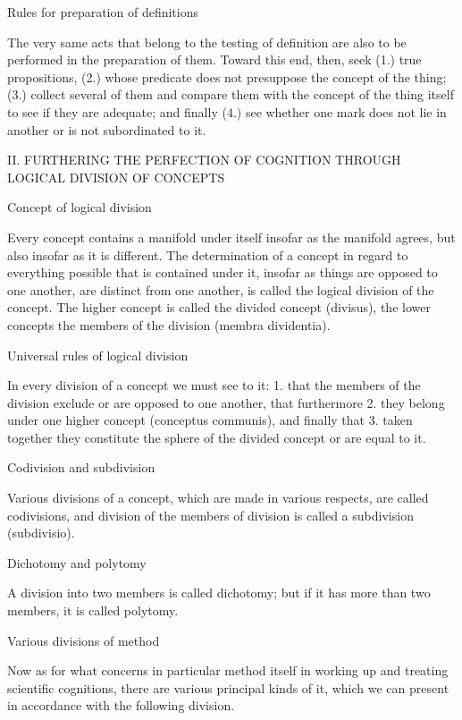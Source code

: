     Rules for preparation of definitions

    The very same acts that belong to the testing of definition are
    also to be performed in the preparation of them.
    Toward this end, then, seek
    (1.)    true propositions,
    (2.)    whose predicate does not presuppose the concept of the thing;
    (3.)    collect several of them and compare them with
            the concept of the thing itself
            to see if they are adequate; and finally
    (4.)    see whether one mark does not lie in another
            or is not subordinated to it.

    II. FURTHERING THE PERFECTION OF COGNITION
    THROUGH LOGICAL DIVISION OF CONCEPTS

    Concept of logical division

    Every concept contains a manifold under itself
    insofar as the manifold agrees,
    but also insofar as it is different.
    The determination of a concept in regard to
    everything possible that is contained under it,
    insofar as things are opposed to one another,
    are distinct from one another,
    is called the logical division of the concept.
    The higher concept is called the divided concept (divisus),
    the lower concepts the members of the division (membra dividentia).

    Universal rules of logical division

    In every division of a concept we must see to it:
    1.  that the members of the division exclude
        or are opposed to one another,
        that furthermore
    2.  they belong under one higher concept (conceptus communis),
        and finally that
    3.  taken together they constitute the sphere of the divided concept
        or are equal to it.

    Codivision and subdivision

    Various divisions of a concept,
    which are made in various respects,
    are called codivisions,
    and division of the members of division
    is called a subdivision (subdivisio).

    Dichotomy and polytomy

    A division into two members is called dichotomy;
    but if it has more than two members, it is called polytomy.

    Various divisions of method

    Now as for what concerns in particular method itself
    in working up and treating scientific cognitions,
    there are various principal kinds of it,
    which we can present in accordance with the following division.

